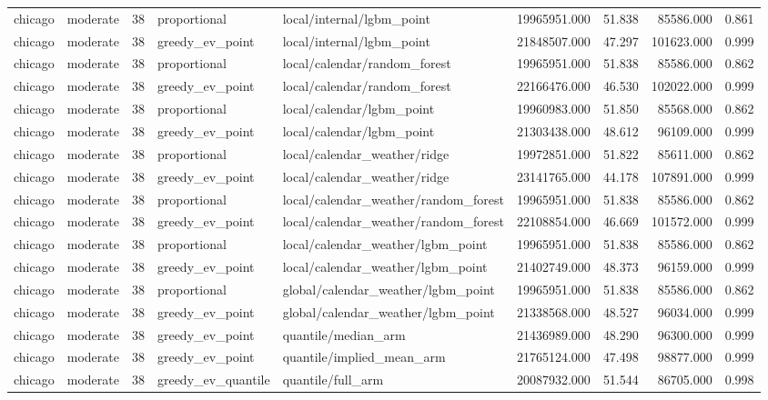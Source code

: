 \begin{tabular}{llrllrrrr}
chicago & moderate & 38 & proportional & local/internal/lgbm\_point & 19965951.000 & 51.838 & 85586.000 & 0.861 \\
chicago & moderate & 38 & greedy\_ev\_point & local/internal/lgbm\_point & 21848507.000 & 47.297 & 101623.000 & 0.999 \\
chicago & moderate & 38 & proportional & local/calendar/random\_forest & 19965951.000 & 51.838 & 85586.000 & 0.862 \\
chicago & moderate & 38 & greedy\_ev\_point & local/calendar/random\_forest & 22166476.000 & 46.530 & 102022.000 & 0.999 \\
chicago & moderate & 38 & proportional & local/calendar/lgbm\_point & 19960983.000 & 51.850 & 85568.000 & 0.862 \\
chicago & moderate & 38 & greedy\_ev\_point & local/calendar/lgbm\_point & 21303438.000 & 48.612 & 96109.000 & 0.999 \\
chicago & moderate & 38 & proportional & local/calendar\_weather/ridge & 19972851.000 & 51.822 & 85611.000 & 0.862 \\
chicago & moderate & 38 & greedy\_ev\_point & local/calendar\_weather/ridge & 23141765.000 & 44.178 & 107891.000 & 0.999 \\
chicago & moderate & 38 & proportional & local/calendar\_weather/random\_forest & 19965951.000 & 51.838 & 85586.000 & 0.862 \\
chicago & moderate & 38 & greedy\_ev\_point & local/calendar\_weather/random\_forest & 22108854.000 & 46.669 & 101572.000 & 0.999 \\
chicago & moderate & 38 & proportional & local/calendar\_weather/lgbm\_point & 19965951.000 & 51.838 & 85586.000 & 0.862 \\
chicago & moderate & 38 & greedy\_ev\_point & local/calendar\_weather/lgbm\_point & 21402749.000 & 48.373 & 96159.000 & 0.999 \\
chicago & moderate & 38 & proportional & global/calendar\_weather/lgbm\_point & 19965951.000 & 51.838 & 85586.000 & 0.862 \\
chicago & moderate & 38 & greedy\_ev\_point & global/calendar\_weather/lgbm\_point & 21338568.000 & 48.527 & 96034.000 & 0.999 \\
chicago & moderate & 38 & greedy\_ev\_point & quantile/median\_arm & 21436989.000 & 48.290 & 96300.000 & 0.999 \\
chicago & moderate & 38 & greedy\_ev\_point & quantile/implied\_mean\_arm & 21765124.000 & 47.498 & 98877.000 & 0.999 \\
chicago & moderate & 38 & greedy\_ev\_quantile & quantile/full\_arm & 20087932.000 & 51.544 & 86705.000 & 0.998 \\

\end{tabular}
